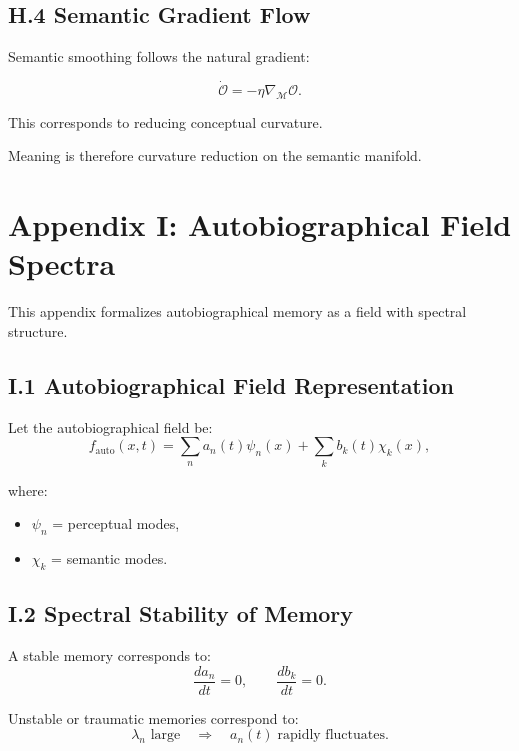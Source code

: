 \documentclass[12pt]{article}
\begin{document}
\subsection*{H.4 Semantic Gradient Flow}

Semantic smoothing follows the natural gradient:

\[
\dot{\mathcal{O}} = -\eta \nabla_{\mathcal{M}} \mathcal{O}.
\]

This corresponds to reducing conceptual curvature.

Meaning is therefore curvature reduction on the semantic manifold.


\section*{Appendix I: Autobiographical Field Spectra}

This appendix formalizes autobiographical memory as a field with spectral
structure.

\subsection*{I.1 Autobiographical Field Representation}

Let the autobiographical field be:
\[
f_{\text{auto}}(x,t)
=
\sum_{n}
    a_n(t) \psi_n(x)
+
\sum_{k}
    b_k(t) \chi_k(x),
\]

where:
\begin{itemize}
\item $\psi_n$ = perceptual modes,
\item $\chi_k$ = semantic modes.
\end{itemize}

\subsection*{I.2 Spectral Stability of Memory}

A stable memory corresponds to:
\[
\frac{da_n}{dt} = 0,
\qquad
\frac{db_k}{dt} = 0.
\]

Unstable or traumatic memories correspond to:
\[
\lambda_n \text{ large}
\quad\Rightarrow\quad
a_n(t) \;\text{rapidly fluctuates}.
\]
\end{document}
